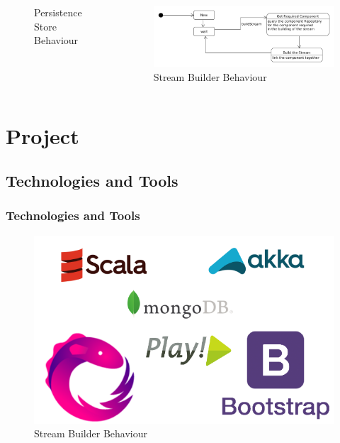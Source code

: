 \documentclass{beamer}
\begin{document}
\begin{frame}
\begin{columns}[c]
\begin{figure}
        \caption{Persistence Store Behaviour}
      \end{figure}
      \begin{figure}
        \includegraphics[width=\linewidth]{../../Docs/ProjectReport/Figures/LogicArchitecture/Server/IStreamBuiderBehavior.png}
        \caption{Stream Builder Behaviour}
      \end{figure}
    \end{columns}
\end{frame}

\section{Project}

\subsection{Technologies and Tools}

\begin{frame}
  \frametitle{Technologies and Tools}
        \begin{figure}
        \includegraphics[width=\linewidth]{../../Docs/ProjectReport/Figures/ToolsLogos.png}
        \caption{Stream Builder Behaviour}
      \end{figure}
\end{frame}
\end{document}
